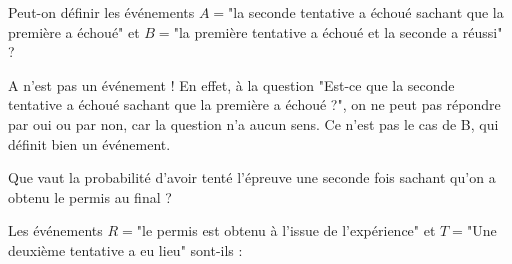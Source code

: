 {\begin{question}
Peut-on définir les événements $A=$"la seconde tentative a échoué sachant que la première a échoué"
et $B=$"la première tentative a échoué et la seconde a réussi" ?
\begin{answers}
\end{answers}
\begin{explanations}
A n'est pas un événement ! En effet, à la question "Est-ce que la seconde tentative a échoué sachant que la première a échoué ?", on ne peut pas répondre par oui ou par non, car la question n'a aucun sens. Ce n'est pas le cas de B, qui définit bien un événement.
\end{explanations}
\end{question}

\begin{question}
\qkeeporder
Que vaut la probabilité d'avoir tenté l'épreuve une seconde fois sachant qu'on a obtenu le permis au final ?
\begin{answers}
\end{answers}
\end{question}

\begin{question}
Les événements $R=$"le permis est obtenu à l'issue de l'expérience" et $T=$"Une deuxième tentative a eu lieu" sont-ils :
\begin{answers}
\end{answers}
\end{question}
}
